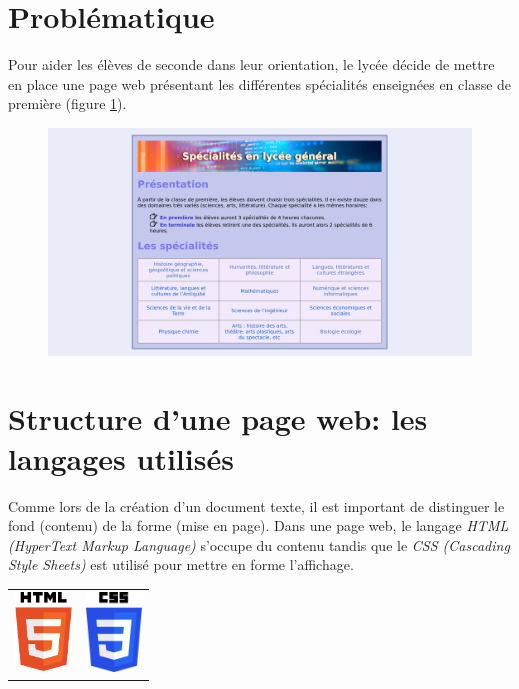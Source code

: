 \documentclass[a4paper,11pt]{article}
\begin{document}
\begin{Form}
\section{Problématique}
Pour aider les élèves de seconde dans leur orientation, le lycée décide de mettre en place une page web présentant les différentes spécialités enseignées en classe de première (figure \ref{pageweb}).
\begin{figure}[!h]
\centering
\includegraphics[width=14cm]{ressources/site.png}
\label{pageweb}
\end{figure}
\begin{center}
\end{center}
\section{Structure d'une page web: les langages utilisés}
Comme lors de la création d'un document texte, il est important de distinguer le fond (contenu) de la forme (mise en page). Dans une page web, le langage \emph{HTML (HyperText Markup Language)} s'occupe du contenu tandis que le \emph{CSS (Cascading Style Sheets)} est utilisé pour mettre en forme l'affichage.
\begin{center}
\begin{tabular}{cc}
\includegraphics[width=1.5cm]{ressources/html.png}
&
\includegraphics[width=1.5cm]{ressources/css.png}
 \\ 
\end{tabular} 
\end{center}


\end{Form}
\end{document}
